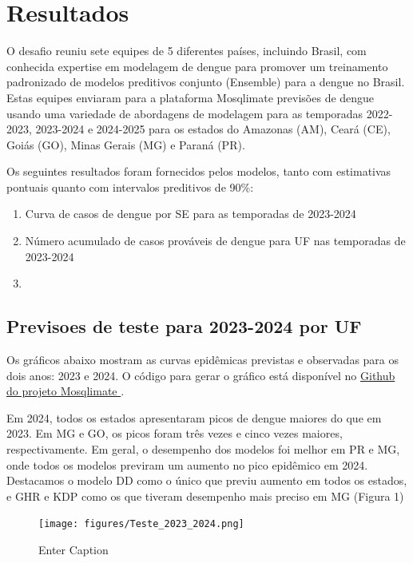 \section{Resultados}

O desafio reuniu sete  equipes  de 5 diferentes países, incluindo Brasil, com conhecida expertise em modelagem de dengue para promover um treinamento padronizado de modelos preditivos conjunto (Ensemble) para a dengue no Brasil. Estas equipes enviaram para a plataforma Mosqlimate previsões de dengue usando uma variedade de abordagens de modelagem para as temporadas 2022-2023, 2023-2024 e 2024-2025 para os estados do Amazonas (AM), Ceará (CE), Goiás (GO), Minas Gerais (MG) e Paraná (PR).

Os seguintes resultados foram fornecidos pelos modelos, tanto com estimativas pontuais quanto com intervalos preditivos de 90\%:

 \begin{enumerate}
    \item Curva de casos de dengue por SE para as temporadas de 2023-2024 
    \item Número acumulado de casos prováveis de dengue para UF nas temporadas de 2023-2024
    \item  \end{enumerate}

\subsection{Previsoes de teste para 2023-2024 por UF}

Os gráficos abaixo mostram as curvas epidêmicas previstas e observadas para os dois anos: 2023 e 2024. O código para gerar o gráfico está disponível no \href{https://github.com/Mosqlimate-project/}{Github do projeto Mosqlimate }.

Em 2024, todos os estados apresentaram picos de dengue maiores do que em 2023. Em MG e GO, os picos foram três vezes e cinco vezes maiores, respectivamente. Em geral, o desempenho dos modelos foi melhor em PR e MG, onde todos os modelos previram um aumento no pico epidêmico em 2024. Destacamos o modelo DD como o único que previu aumento em todos os estados, e GHR e KDP como os que tiveram desempenho mais preciso em MG (Figura 1)

\begin{figure}
    \centering
    \texttt{[image: figures/Teste\_2023\_2024.png]}
    \caption{Enter Caption}
    \label{fig:enter-label}
\end{figure}
    

